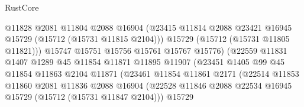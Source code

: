 \begin{lexlean}{RustCore}
\begin{coremodule}
                                      @11828
                                      @2081
                                      @11804
                                      @2088
                                      @16904
                                      (@23415
                                        @11814
                                        @2088
                                        @23421
                                        @16945
                                        @15729
                                        (@15712 (@15731 @11815 @2104)))
                                      @15729
                                      (@15712 (@15731 @11805 @11821)))
                                    @15747
                                    @15751
                                    @15756
                                    @15761
                                    @15767
                                    @15776)
                                  (@22559
                                    @11831
                                    @1407
                                    @1289
                                    @45
                                    @11854
                                    @11871
                                    @11895
                                    @11907
                                    (@23451
                                      @1405
                                      @99
                                      @45
                                      @11854
                                      @11863
                                      @2104
                                      @11871
                                      (@23461
                                        @11854
                                        @11861
                                        @2171
                                        (@22514
                                          @11853
                                          @11860
                                          @2081
                                          @11836
                                          @2088
                                          @16904
                                          (@22528
                                            @11846
                                            @2088
                                            @22534
                                            @16945
                                            @15729
                                            (@15712 (@15731 @11847 @2104)))
                                          @15729

\end{coremodule}
\end{lexlean}
